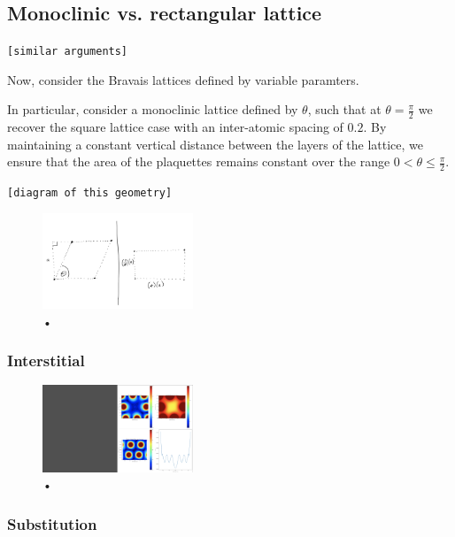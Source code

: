 \documentclass[aps,pra,superscriptaddress,twocolumn]{revtex4-1}
\newcommand{\commentSB}[1]{\texttt{\color{blue}[#1]}}
\newcommand{\commentSO}[1]{\texttt{\color{orange}[#1]}}
\begin{document}
\subsection{Monoclinic vs. rectangular lattice}
\commentSO{similar arguments}

Now, consider the Bravais lattices defined by variable paramters. 

In particular, consider a monoclinic lattice defined by $\theta$, such that at $\theta = \frac{\pi}{2}$ we recover the square lattice case with an inter-atomic spacing of $0.2$. By maintaining a constant vertical distance between the layers of the lattice, we ensure that the area of the plaquettes remains constant over the range $ 0 < \theta \leq \frac{\pi}{2}$. 

\commentSB{diagram of this geometry}

\begin{figure}
    \centering
    \includegraphics[width=0.4\textwidth]{figures/mono_rect_geo.png} 
    \caption{•}
    \label{fig:mono_rect_geo}
\end{figure}

\subsubsection{Interstitial}

\begin{figure}
    \centering
    \includegraphics[width=0.4\textwidth]{figures/mono_rect_plaquettes_interstitial.png} 
    \caption{•}
    \label{fig:mono_rect_plaquette_interstitial}
\end{figure}


\subsubsection{Substitution}
\end{document}
